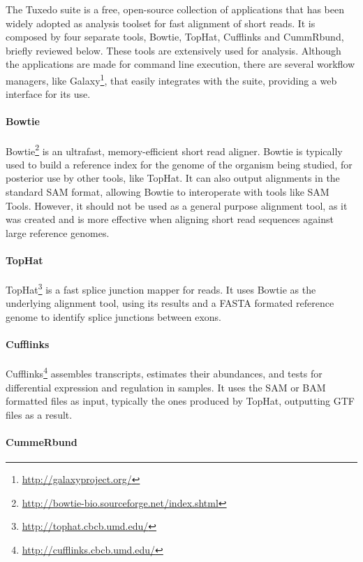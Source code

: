 The Tuxedo suite is a free, open-source collection of applications that has been
widely adopted as analysis toolset for fast alignment of short reads. It is
composed by four separate tools, Bowtie, TopHat, Cufflinks and CummRbund,
briefly reviewed below. These tools are extensively used for \rnaseq{} analysis.
Although the applications are made for command line execution, there are several
workflow managers, like Galaxy\footnote{\url{http://galaxyproject.org/}}, that
easily integrates with the suite, providing a web interface for its use.

\paragraph{Bowtie}

Bowtie\footnote{\url{http://bowtie-bio.sourceforge.net/index.shtml}} is an
ultrafast, memory-efficient short read aligner. Bowtie is typically used to
build a reference index for the genome of the organism being studied, for
posterior use by other tools, like TopHat. It can also output alignments in the
standard SAM format, allowing Bowtie to interoperate with tools like SAM Tools.
However, it should not be used as a general purpose alignment tool, as it was
created and is more effective when aligning short read sequences against large
reference genomes.

\paragraph{TopHat}

TopHat\footnote{\url{http://tophat.cbcb.umd.edu/}} is a fast splice junction
mapper for \rnaseq{} reads. It uses Bowtie as the underlying alignment tool,
using its results and a FASTA formated reference genome to identify splice
junctions between exons.

\paragraph{Cufflinks}

Cufflinks\footnote{\url{http://cufflinks.cbcb.umd.edu/}} assembles transcripts,
estimates their abundances, and tests for differential expression and regulation
in \rnaseq{} samples. It uses the SAM or BAM formatted files as input, typically
the ones produced by TopHat, outputting GTF files as a result.

\paragraph{CummeRbund}

